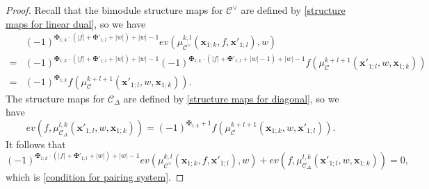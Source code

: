\documentclass[11pt]{amsproc}
\def\cc{\mathcal{C}}
\def\D{\Delta}
\theoremstyle{remark}
\numberwithin{equation}{section}
\begin{document}
\begin{proof}
Recall that the bimodule structure maps for $\cc^{\vee}$ are defined by \eqref{structure maps for linear dual}, so we have
\begin{equation}
\begin{split}
&    (-1)^{\maltese_{1;k} \cdot(|f| + \maltese'_{1; l} + |w|) + |w| - 1} ev(\mu_{\cc^{\vee}}^{k, l}(\mathbf{x}_{1; k}, f, \mathbf{x}'_{1; l}), w) \\
= & (-1)^{\maltese_{1;k} \cdot(|f| + \maltese'_{1; l} + |w|) + |w| - 1}  (-1)^{\maltese_{1;k} \cdot(|f| + \maltese'_{1; l} + |w|-1) + |w| - 1} f(\mu^{k+l+1}_{\cc}(\mathbf{x}'_{1;l}, w, \mathbf{x}_{1;k})) \\
= & (-1)^{\maltese_{1;k}} f(\mu^{k+l+1}_{\cc}(\mathbf{x}'_{1;l}, w, \mathbf{x}_{1;k})).
\end{split}
\end{equation}
The structure maps for $\cc_{\D}$ are defined by \eqref{structure maps for diagonal}, so we have
\begin{equation}
ev(f, \mu_{\cc_{\D}}^{l, k}(\mathbf{x}'_{1;l}, w, \mathbf{x}_{1;k})) = (-1)^{\maltese_{1;k} +1} f(\mu_{\cc}^{k+l+1}(\mathbf{x}_{1;k}, w, \mathbf{x}'_{1;l})).
\end{equation}
It follows that 
\[
(-1)^{\maltese_{1;k} \cdot(|f| + \maltese'_{1; l} + |w|) + |w| - 1}  ev(\mu_{\cc^{\vee}}^{k, l}(\mathbf{x}_{1; k}, f, \mathbf{x}'_{1; l}), w)
+ ev(f, \mu_{\cc_{\D}}^{l, k}(\mathbf{x}'_{1;l}, w, \mathbf{x}_{1;k})) = 0,
\]
which is \eqref{condition for pairing system}.


\end{proof}
\end{document}
